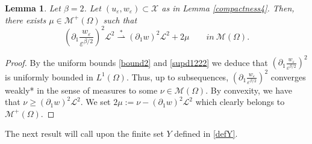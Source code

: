 \documentclass[a4, 11pt, reqno, final]{amsart}
\newcommand{\calL}{\mathcal{L}}
\newcommand{\calM}{\mathcal{M}}
\newcommand{\calX}{\mathcal{X}}
\newcommand\e{\varepsilon}
\newcommand\weakstar{\stackrel{\ast }{\rightharpoonup}}  %
\theoremstyle{plain}%
\newtheorem{lemma}[theorem]{Lemma}
\newcommand{\QED}{\hspace{1ex}\hfill$\blacksquare$\vspace{2ex}}
\begin{document}
	\begin{lemma}\label{lemmamu2}
		Let $\beta=2$. Let $(u_\e, w_\e)\subset \calX$ as in Lemma \ref{compactness4}. Then, there exists $\mu \in \calM^+(\Omega)$ such that
		\begin{equation}\label{cmp4}(\partial_1 \frac{w_\e}{\e^{\beta/2}})^2 \calL^2 \weakstar (\partial_1 w)^2\calL^2 + 2\mu \qquad  in \ \calM(\Omega).\end{equation}
	\end{lemma}
	\begin{proof}
		By the uniform bounds \eqref{bound2} and \eqref{supd1222} we deduce that $(\partial_1 \frac{w_\e}{\e^{\beta/2}})^2$ is uniformly bounded in $L^1({\Omega})$. Thus, up to subsequences, $(\partial_1\frac{{w}_\e}{\e^{\beta/2}})^2 $ converges weakly* in the sense of measures to some ${\nu} \in \calM({\Omega})$. By convexity, we have that ${\nu} \geq (\partial_1 {w})^2\calL^2$. We set $2\mu:={\nu} - (\partial_1 {w})^2\calL^2$ which clearly belongs to $\calM^+({\Omega})$. %
	\end{proof}


	The next result will call upon the finite set $Y$ defined in \eqref{defY}.
\end{document}
